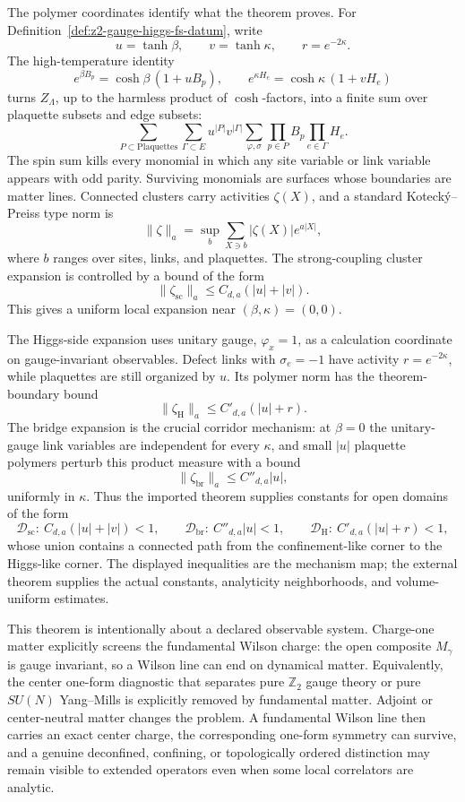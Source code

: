 The polymer coordinates identify what the theorem proves.  For
Definition~\ref{def:z2-gauge-higgs-fs-datum}, write
\[
  u=\tanh\beta,\qquad v=\tanh\kappa,\qquad r=e^{-2\kappa}.
\]
The high-temperature identity
\[
  e^{\beta B_p}=\cosh\beta\,(1+uB_p),\qquad
  e^{\kappa H_e}=\cosh\kappa\,(1+vH_e)
\]
turns \(Z_\Lambda\), up to the harmless product of \(\cosh\)-factors, into a
finite sum over plaquette subsets and edge subsets:
\[
  \sum_{P\subset\mathrm{Plaquettes}}\sum_{\Gamma\subset E}
  u^{|P|}v^{|\Gamma|}
  \sum_{\varphi,\sigma}
  \prod_{p\in P}B_p\prod_{e\in\Gamma}H_e .
\]
The spin sum kills every monomial in which any site variable or link variable
appears with odd parity.  Surviving monomials are surfaces whose boundaries
are matter lines.  Connected clusters carry activities \(\zeta(X)\), and a
standard Koteck\'y--Preiss type norm is
\begin{equation}
  \|\zeta\|_a
  =
  \sup_b
  \sum_{X\ni b} |\zeta(X)|e^{a|X|},
  \label{eq:fradkin-shenker-polymer-norm}
\end{equation}
where \(b\) ranges over sites, links, and plaquettes.  The strong-coupling
cluster expansion is controlled by a bound of the form
\[
  \|\zeta_{\mathrm{sc}}\|_a
  \leq C_{d,a}(|u|+|v|).
\]
This gives a uniform local expansion near \((\beta,\kappa)=(0,0)\).

The Higgs-side expansion uses unitary gauge, \(\varphi_x=1\), as a calculation
coordinate on gauge-invariant observables.  Defect links with
\(\sigma_e=-1\) have activity \(r=e^{-2\kappa}\), while plaquettes are still
organized by \(u\).  Its polymer norm has the theorem-boundary bound
\[
  \|\zeta_{\mathrm{H}}\|_a
  \leq C'_{d,a}(|u|+r).
\]
The bridge expansion is the crucial corridor mechanism: at \(\beta=0\) the
unitary-gauge link variables are independent for every \(\kappa\), and small
\(|u|\) plaquette polymers perturb this product measure with a bound
\[
  \|\zeta_{\mathrm{br}}\|_a
  \leq C''_{d,a}|u|,
\]
uniformly in \(\kappa\).  Thus the imported theorem supplies constants for
open domains of the form
\[
  \mathcal D_{\mathrm{sc}}:\ C_{d,a}(|u|+|v|)<1,\qquad
  \mathcal D_{\mathrm{br}}:\ C''_{d,a}|u|<1,\qquad
  \mathcal D_{\mathrm{H}}:\ C'_{d,a}(|u|+r)<1,
\]
whose union contains a connected path from the confinement-like corner to the
Higgs-like corner.  The displayed inequalities are the mechanism map; the
external theorem supplies the actual constants, analyticity neighborhoods, and
volume-uniform estimates.

This theorem is intentionally about a declared observable system.  Charge-one
matter explicitly screens the fundamental Wilson charge: the open composite
\(M_\gamma\) is gauge invariant, so a Wilson line can end on dynamical matter.
Equivalently, the center one-form diagnostic that separates pure
\(\mathbb Z_2\) gauge theory or pure \(SU(N)\) Yang--Mills is explicitly
removed by fundamental matter.  Adjoint or center-neutral matter changes the
problem.  A fundamental Wilson line then carries an exact center charge, the
corresponding one-form symmetry can survive, and a genuine deconfined,
confining, or topologically ordered distinction may remain visible to
extended operators even when some local correlators are analytic.

